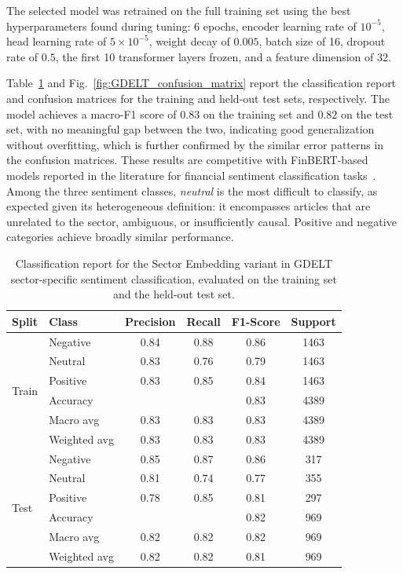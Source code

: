 The selected model was retrained on the full training set using the best hyperparameters found during tuning: 6 epochs, encoder learning rate of $10^{-5}$, head learning rate of $5 \times 10^{-5}$, weight decay of $0.005$, batch size of 16, dropout rate of $0.5$, the first 10 transformer layers frozen, and a feature dimension of 32.

Table~\ref{tab:GDELT_classification_report} and Fig.~\ref{fig:GDELT_confusion_matrix} report the classification report and confusion matrices for the training and held-out test sets, respectively. The model achieves a macro-F1 score of $0.83$ on the training set and $0.82$ on the test set, with no meaningful gap between the two, indicating good generalization without overfitting, which is further confirmed by the similar error patterns in the confusion matrices. These results are competitive with FinBERT-based models reported in the literature for financial sentiment classification tasks~\cite{rjhc3}. Among the three sentiment classes, \textit{neutral} is the most difficult to classify, as expected given its heterogeneous definition: it encompasses articles that are unrelated to the sector, ambiguous, or insufficiently causal. Positive and negative categories achieve broadly similar performance.

\begin{table}[H]
\centering
\caption{Classification report for the Sector Embedding variant in GDELT sector-specific sentiment classification, evaluated on the training set and the held-out test set.}
\label{tab:GDELT_classification_report}
\renewcommand{\arraystretch}{1.2}
\begin{tabular}{|l|lcccc|}
\hline
\textbf{Split} & \textbf{Class} & \textbf{Precision} & \textbf{Recall} & \textbf{F1-Score} & \textbf{Support} \\
\hline\hline
\multirow{6}{*}{Train}
& Negative     & 0.84 & 0.88 & 0.86 & 1463 \\
& Neutral      & 0.83 & 0.76 & 0.79 & 1463 \\
& Positive     & 0.83 & 0.85 & 0.84 & 1463 \\
\cline{2-6}
& Accuracy     &      &      & 0.83 & 4389 \\
& Macro avg    & 0.83 & 0.83 & 0.83 & 4389 \\
& Weighted avg & 0.83 & 0.83 & 0.83 & 4389 \\
\hline\hline
\multirow{6}{*}{Test}
& Negative     & 0.85 & 0.87 & 0.86 & 317 \\
& Neutral      & 0.81 & 0.74 & 0.77 & 355 \\
& Positive     & 0.78 & 0.85 & 0.81 & 297 \\
\cline{2-6}
& Accuracy     &      &      & 0.82 & 969 \\
& Macro avg    & 0.82 & 0.82 & 0.82 & 969 \\
& Weighted avg & 0.82 & 0.82 & 0.81 & 969 \\
\hline
\end{tabular}
\end{table}

